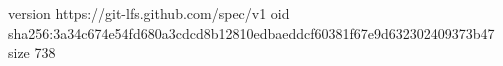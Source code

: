 version https://git-lfs.github.com/spec/v1
oid sha256:3a34c674e54fd680a3cdcd8b12810edbaeddcf60381f67e9d632302409373b47
size 738
